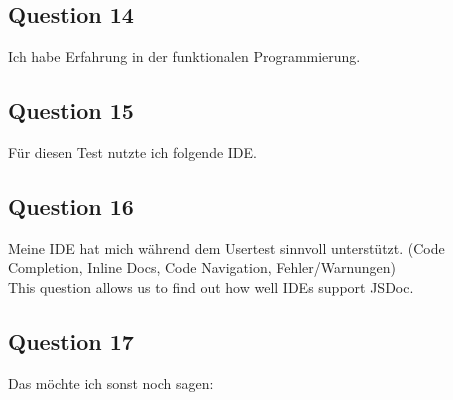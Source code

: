 \subsection*{Question 14}
\label{sub:ut_q14}
Ich habe Erfahrung in der funktionalen Programmierung.
\subsection*{Question 15}
\label{sub:ut_q15}
Für diesen Test nutzte ich folgende IDE.
\subsection*{Question 16}
Meine IDE hat mich während dem Usertest sinnvoll unterstützt. (Code Completion,
Inline Docs, Code Navigation,  Fehler/Warnungen) \\
This question allows us to find out how well IDEs support JSDoc.
\label{sub:ut_q16}
\subsection*{Question 17}
\label{sub:ut_q17}
Das möchte ich sonst noch sagen:
